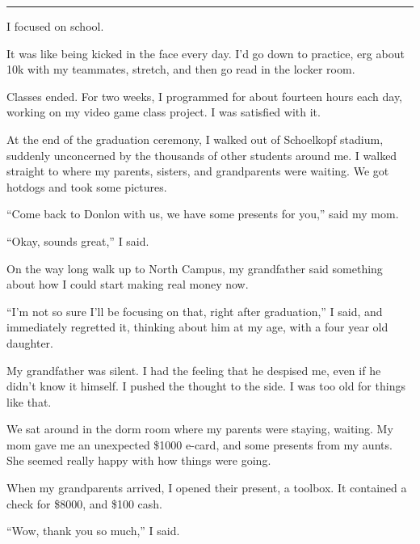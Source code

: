 \plainfancybreak{12pt}{2}{}

I focused on school.

It was like being kicked in the face every day.  I'd go down to practice, erg
about 10k with my teammates, stretch, and then go read in the locker room.

Classes ended.  For two weeks, I programmed for about fourteen hours each day,
working on my video game class project.  I was satisfied with it.

At the end of the graduation ceremony, I walked out of Schoelkopf stadium,
suddenly unconcerned by the thousands of other students around me.  I walked
straight to where my parents, sisters, and grandparents were waiting.  We got
hotdogs and took some pictures.

``Come back to Donlon with us, we have some presents for you,'' said my mom.

``Okay, sounds great,'' I said.

On the way long walk up to North Campus, my grandfather said something about how
I could start making real money now.

``I'm not so sure I'll be focusing on that, right after graduation,'' I said,
and immediately regretted it, thinking about him at my age, with a four year old
daughter.

My grandfather was silent.  I had the feeling that he despised me, even if he
didn't know it himself.  I pushed the thought to the side.  I was too old for
things like that.

We sat around in the dorm room where my parents were staying, waiting.  My mom
gave me an unexpected \$1000 e-card, and some presents from my aunts.  She
seemed really happy with how things were going.

When my grandparents arrived, I opened their present, a toolbox.  It contained a
check for \$8000, and \$100 cash.

``Wow, thank you so much,'' I said.
